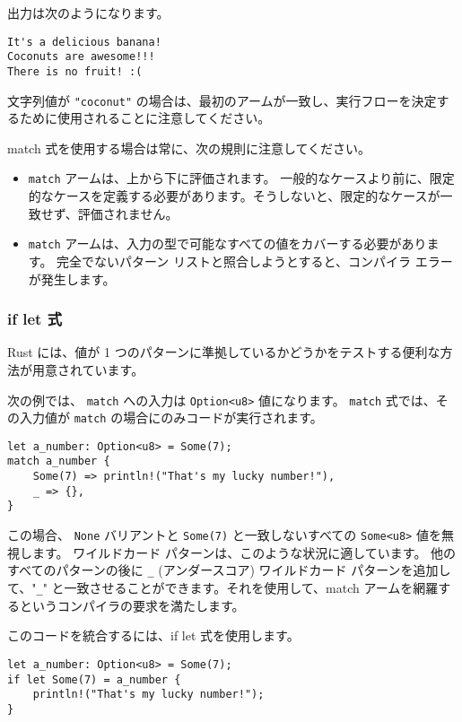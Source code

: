 出力は次のようになります。

\begin{lstlisting}[numbers=none]
It's a delicious banana!
Coconuts are awesome!!!
There is no fruit! :(
\end{lstlisting}

文字列値が \texttt{"coconut"} の場合は、最初のアームが一致し、実行フローを決定するために使用されることに注意してください。

match 式を使用する場合は常に、次の規則に注意してください。

\begin{itemize}
\item \texttt{match} アームは、上から下に評価されます。 一般的なケースより前に、限定的なケースを定義する必要があります。そうしないと、限定的なケースが一致せず、評価されません。
\item \texttt{match} アームは、入力の型で可能なすべての値をカバーする必要があります。 完全でないパターン リストと照合しようとすると、コンパイラ エラーが発生します。
\end{itemize}

\subsubsection{if let 式}

Rust には、値が 1 つのパターンに準拠しているかどうかをテストする便利な方法が用意されています。

次の例では、 \texttt{match} への入力は \texttt{Option<u8>} 値になります。 \texttt{match} 式では、その入力値が \texttt{match} の場合にのみコードが実行されます。

\begin{lstlisting}[numbers=none]
let a_number: Option<u8> = Some(7);
match a_number {
    Some(7) => println!("That's my lucky number!"),
    _ => {},
}
\end{lstlisting}

この場合、 \texttt{None} バリアントと \texttt{Some(7)} と一致しないすべての \texttt{Some<u8>} 値を無視します。 ワイルドカード パターンは、このような状況に適しています。 他のすべてのパターンの後に \texttt{\_} (アンダースコア) ワイルドカード パターンを追加して、"\texttt{\_}" と一致させることができます。それを使用して、match アームを網羅するというコンパイラの要求を満たします。

このコードを統合するには、if let 式を使用します。

\begin{lstlisting}[numbers=none]
let a_number: Option<u8> = Some(7);
if let Some(7) = a_number {
    println!("That's my lucky number!");
}
\end{lstlisting}

